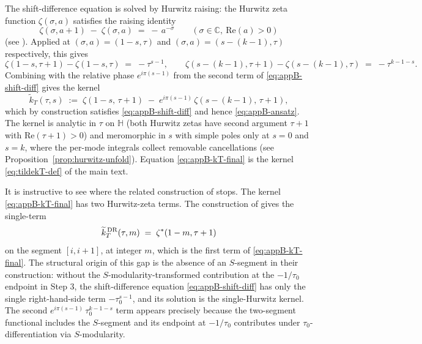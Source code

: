\documentclass[11pt]{article}
\numberwithin{equation}{section}  %
\newcommand{\HH}{\mathbb{H}}
\newcommand{\CC}{\mathbb{C}}
\begin{document}
The shift-difference equation is solved by Hurwitz raising: the Hurwitz
zeta function $\zeta(\sigma, a)$ satisfies the raising
identity
\begin{equation}\label{eq:appB-hurwitz-raising}
  \zeta(\sigma, a + 1) \;-\; \zeta(\sigma, a) \;=\; -\,a^{-\sigma}
  \qquad (\sigma \in \CC,\ \mathrm{Re}(a) > 0)
\end{equation}
(see \cite[\S25.11.3]{DLMF}).  Applied at $(\sigma, a) = (1 - s, \tau)$
and $(\sigma, a) = (s - (k - 1), \tau)$ respectively, this gives
\begin{equation}
  \zeta(1 - s, \tau + 1) - \zeta(1 - s, \tau) \;=\; -\tau^{s-1},
  \qquad
  \zeta(s - (k - 1), \tau + 1) - \zeta(s - (k - 1), \tau)
  \;=\; -\tau^{k - 1 - s}.
\end{equation}
Combining with the relative phase $e^{i\pi(s-1)}$ from the second
term of \eqref{eq:appB-shift-diff} gives the kernel
\begin{equation}\label{eq:appB-kT-final}
  \widetilde{k}_T(\tau, s)
  \;:=\; \zeta(1 - s,\, \tau + 1)
  \;-\; e^{i\pi(s-1)}\,\zeta(s - (k - 1),\, \tau + 1),
\end{equation}
which by construction satisfies \eqref{eq:appB-shift-diff} and hence
\eqref{eq:appB-ansatz}.  The kernel is analytic in $\tau$ on $\HH$
(both Hurwitz zetas have second argument $\tau + 1$ with
$\mathrm{Re}(\tau + 1) > 0$) and meromorphic in $s$ with simple poles
only at $s = 0$ and $s = k$, where the per-mode integrals collect
removable cancellations (see Proposition~\ref{prop:hurwitz-unfold}).
Equation \eqref{eq:appB-kT-final} is the kernel
\eqref{eq:tildekT-def} of the main text.

It is instructive to see where the related construction of \cite{DR2022}
stops.  The kernel \eqref{eq:appB-kT-final} has two Hurwitz-zeta terms.  The
construction of \cite[Thm.~1.2]{DR2022} gives the single-term
\begin{equation}
  \widetilde{k}_T^{\,\rm DR}(\tau, m)
  \;=\; \zeta^*(1 - m, \tau + 1)
\end{equation}
on the segment $[i, i+1]$, at integer $m$, which is the first term of
\eqref{eq:appB-kT-final}.  The structural origin of this gap is the
absence of an $S$-segment in their construction: without the
$S$-modularity-transformed contribution at the $-1/\tau_0$ endpoint
in Step 3, the shift-difference equation \eqref{eq:appB-shift-diff}
has only the single right-hand-side term $-\tau_0^{s-1}$, and its
solution is the single-Hurwitz kernel.  The second
$e^{i\pi(s-1)}\,\tau_0^{k-1-s}$ term appears precisely because the
two-segment functional includes the $S$-segment and its endpoint at
$-1/\tau_0$ contributes under $\tau_0$-differentiation via
$S$-modularity.
\end{document}
